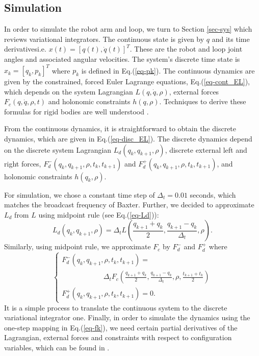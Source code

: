 \documentclass[letterpaper, 10pt, conference]{ieeeconf}
\begin{document}
\subsection{Simulation}
In order to simulate the robot arm and loop, we turn to Section \ref{sec-sys} which reviews variational integrators.  The continuous state is given by $q$ and its time derivatives\textemdash i.e. $x(t) = [q(t),\dot{q}(t)]^T$.  These are the robot and loop joint angles and associated angular velocities.  The system's discrete time state is $x_k = [q_k,p_k]^T$ where $p_k$ is defined in Eq.(\ref{eq-pk}).   The continuous dynamics are given by the constrained, forced Euler Lagrange equations, Eq.(\ref{eq-cont_EL}), which depends on the system Lagrangian $L(q,\dot{q},\rho)$, external forces $F_c(q,\dot{q},\rho,t)$ and holonomic constraints $h(q,\rho)$. Techniques to derive these formulas for rigid bodies are well understood \cite{murray_li_sastry}.  

From the continuous dynamics, it is straightforward to obtain the discrete dynamics, which are given in Eq.(\ref{eq-disc_EL}).  The discrete dynamics depend on the discrete system Lagrangian $L_d(q_{k},q_{k+1},\rho)$, discrete external left and right forces, $F_d^-(q_{k},q_{k+1},\rho,t_k,t_{k+1})$ and $F_d^+(q_{k},q_{k+1},\rho,t_k,t_{k+1})$, and holonomic constraints $h(q_k,\rho)$.  

For simulation, we chose a constant time step of $\Delta_t = 0.01$ seconds, which matches the broadcast frequency of Baxter.  Further, we decided to approximate $L_d$ from $L$ using midpoint rule (see Eq.(\ref{eq-Ld})):
\[
L_d(q_k,q_{k+1},\rho) = \Delta_t L(\frac{q_{k+1}+q_k}{2},\frac{q_{k+1}-q_k}{\Delta_t},\rho).
\]
Similarly, using midpoint rule, we approximate $F_c$ by $F_d^-$ and $F_d^+$ where
\[
\left\{
\begin{array}{l}
F_d^-(q_k,q_{k+1},\rho,t_k,t_{k+1}) = \\\hspace{70pt}\Delta_t F_c(\frac{q_{k+1}+q_k}{2},\frac{q_{k+1}-q_k}{\Delta_t},\rho,\frac{t_{k+1}+t_k}{2})\\
F_d^+(q_k,q_{k+1},\rho,t_k,t_{k+1}) = 0.
\end{array}
\right.
\]
It is a simple process to translate the continuous system to the discrete variational integrator one. Finally, in order to simulate the dynamics using the one-step mapping in Eq.(\ref{eq-fk}), we need certain partial derivatives of the Lagrangian, external forces and constraints with respect to configuration variables, which can be found in \cite{johnson_murphey_scalable}.  
\end{document}
